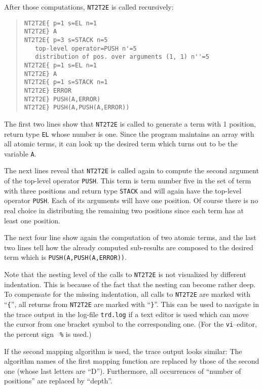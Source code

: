 After those computations, {\tt NT2T2E} is called recursively: 
\begin{quote}
\begin{verbatim}
NT2T2E{ p=1 s=EL n=1
NT2T2E} A
NT2T2E{ p=3 s=STACK n=5
   top-level operator=PUSH n'=5
   distribution of pos. over arguments (1, 1) n''=5
NT2T2E{ p=1 s=EL n=1
NT2T2E} A
NT2T2E{ p=1 s=STACK n=1
NT2T2E} ERROR
NT2T2E} PUSH(A,ERROR)
NT2T2E} PUSH(A,PUSH(A,ERROR))
\end{verbatim}
\end{quote}
The first two lines show that {\tt NT2T2E} is called to generate a term
with 1 position, return type {\tt EL} whose number is one. Since the
program maintains an array with all atomic terms, it can look up the
desired term which turns out to be the variable {\tt A}.

The next lines reveal that {\tt NT2T2E} is called again to compute the
second argument of the top-level operator {\tt PUSH}. This term is term
number five in the set of term with three positions and return type
{\tt STACK} and will again have the top-level operator {\tt PUSH}.
Each of its arguments will have one position.  Of course there is no
real choice in distributing the remaining two positions since each term
has at least one position.

The next four line show again the computation of two atomic terms, and
the last two lines tell how the already computed sub-results are composed
to the desired term which is {\tt PUSH(A,PUSH(A,ERROR))}.

Note that the nesting level of the calls to {\tt NT2T2E} is not
visualized by different indentation. This is because of the fact that the
nesting can become rather deep.  To compensate for the missing
indentation, all calls to {\tt NT2T2E} are marked with ``{\tt \{}'', all
returns from {\tt NT2T2E} are marked with ``{\tt \}}''.  This can be used to
navigate in the trace output in the log-file {\tt trd.log} if a
text editor is used which can move the cursor from one bracket symbol to
the corresponding one. (For the {\tt vi}--editor, the percent sign {\tt
\%} is used.)

If the second mapping algorithm is used, the trace output looks similar:
The algorithm names of the first mapping function are replaced by
those of the second one (whose last letters are ``D'').
Furthermore, all occurrences of ``number of positions'' are replaced by
``depth''.
